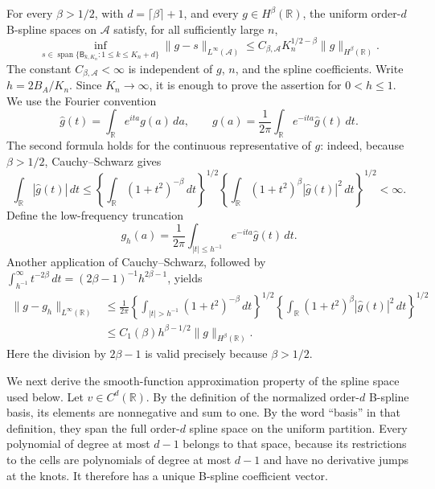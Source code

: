 For every \(\beta>1/2\), with \(d=\lceil\beta\rceil+1\), and every \(g\in H^\beta(\mathbb R)\), the uniform order-\(d\) B-spline spaces on \(\mathcal A\) satisfy, for all sufficiently large \(n\),
\[
 \inf_{s\in\operatorname{span}\{\mathsf B_{k,K_n}:1\le k\le K_n+d\}}
 \|g-s\|_{L^\infty(\mathcal A)}
 \le C_{\beta,\mathcal A}K_n^{1/2-\beta}
       \|g\|_{H^\beta(\mathbb R)}.
\]
The constant \(C_{\beta,\mathcal A}<\infty\) is independent of \(g\), \(n\), and the spline coefficients.
Write \(h=2B_A/K_n\).  Since \(K_n\to\infty\), it is enough to prove the assertion for \(0<h\le1\).  We use the Fourier convention
\[
 \widehat g(t)=\int_{\mathbb R}e^{ita}g(a)\,da,
 \qquad
 g(a)=\frac1{2\pi}\int_{\mathbb R}e^{-ita}\widehat g(t)\,dt.
\]
The second formula holds for the continuous representative of \(g\): indeed, because \(\beta>1/2\), Cauchy--Schwarz gives
\[
 \int_{\mathbb R}|\widehat g(t)|\,dt
 \le
 \left\{\int_{\mathbb R}(1+t^2)^{-\beta}\,dt\right\}^{1/2}
 \left\{\int_{\mathbb R}(1+t^2)^\beta|\widehat g(t)|^2\,dt\right\}^{1/2}
 <\infty.                                                        \tag{1}
\]
Define the low-frequency truncation
\[
 g_h(a)=\frac1{2\pi}\int_{|t|\le h^{-1}}e^{-ita}\widehat g(t)\,dt.
\]
Another application of Cauchy--Schwarz, followed by
\(\int_{h^{-1}}^\infty t^{-2\beta}\,dt=(2\beta-1)^{-1}h^{2\beta-1}\), yields
\[
 \begin{aligned}
 \|g-g_h\|_{L^\infty(\mathbb R)}
 &\le \frac1{2\pi}
 \left\{\int_{|t|>h^{-1}}(1+t^2)^{-\beta}\,dt\right\}^{1/2}
 \left\{\int_{\mathbb R}(1+t^2)^\beta|\widehat g(t)|^2\,dt\right\}^{1/2}\\
 &\le C_1(\beta)h^{\beta-1/2}\|g\|_{H^\beta(\mathbb R)}.       \tag{2}
 \end{aligned}
\]
Here the division by \(2\beta-1\) is valid precisely because \(\beta>1/2\).

We next derive the smooth-function approximation property of the spline space used below.  Let \(v\in C^d(\mathbb R)\).  By the definition of the normalized order-\(d\) B-spline basis, its elements are nonnegative and sum to one.  By the word ``basis'' in that definition, they span the full order-\(d\) spline space on the uniform partition.  Every polynomial of degree at most \(d-1\) belongs to that space, because its restrictions to the cells are polynomials of degree at most \(d-1\) and have no derivative jumps at the knots.  It therefore has a unique B-spline coefficient vector.


